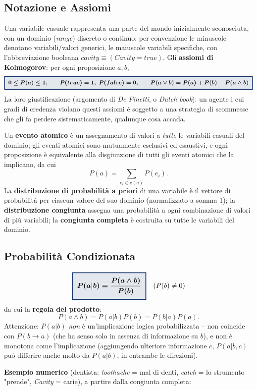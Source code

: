 \documentclass[a4paper,11pt]{article}
\newcommand{\keyeq}[1]{{\setlength{\fboxsep}{6pt}\setlength{\fboxrule}{1.3pt}\fcolorbox{iablue}{iablue!12}{\boldmath$\displaystyle #1$}}}
\begin{document}
\subsection{Notazione e Assiomi}

Una variabile casuale rappresenta una parte del mondo inizialmente sconosciuta, con un dominio (\emph{range}) discreto o continuo; per convenzione le minuscole denotano variabili/valori generici, le maiuscole variabili specifiche, con l'abbreviazione booleana $cavity\equiv(Cavity{=}true)$. Gli \textbf{assiomi di Kolmogorov}: per ogni proposizione $a,b$,
\[
\keyeq{0\leq P(a)\leq1,\qquad P(true)=1,\ P(false)=0,\qquad P(a\vee b)=P(a)+P(b)-P(a\wedge b)}
\]
La loro giustificazione (argomento di \emph{De Finetti}, o \emph{Dutch book}): un agente i cui gradi di credenza violano questi assiomi è soggetto a una strategia di scommesse che gli fa perdere sistematicamente, qualunque cosa accada.

Un \textbf{evento atomico} è un assegnamento di valori a \emph{tutte} le variabili casuali del dominio; gli eventi atomici sono mutuamente esclusivi ed esaustivi, e ogni proposizione è equivalente alla disgiunzione di tutti gli eventi atomici che la implicano, da cui
\[
P(a) = \sum_{e_i\in\mathbf{e}(a)} P(e_i).
\]
La \textbf{distribuzione di probabilità a priori} di una variabile è il vettore di probabilità per ciascun valore del suo dominio (normalizzato a somma 1); la \textbf{distribuzione congiunta} assegna una probabilità a ogni combinazione di valori di più variabili; la \textbf{congiunta completa} è costruita su tutte le variabili del dominio.

\subsection{Probabilità Condizionata}

\[
\keyeq{P(a|b) = \frac{P(a\wedge b)}{P(b)}} \quad (P(b)\neq0)
\]
da cui la \textbf{regola del prodotto}:
\[
P(a\wedge b)=P(a|b)P(b)=P(b|a)P(a).
\]
Attenzione: $P(a|b)$ \emph{non} è un'implicazione logica probabilizzata -- non coincide con $P(b\to a)$ (che ha senso solo in assenza di informazione su $b$), e non è monotona come l'implicazione (aggiungendo ulteriore informazione $c$, $P(a|b,c)$ può differire anche molto da $P(a|b)$, in entrambe le direzioni).

\textbf{Esempio numerico} (dentista: \emph{toothache} = mal di denti, \emph{catch} = lo strumento "prende", \emph{Cavity} = carie), a partire dalla congiunta completa:
\end{document}
